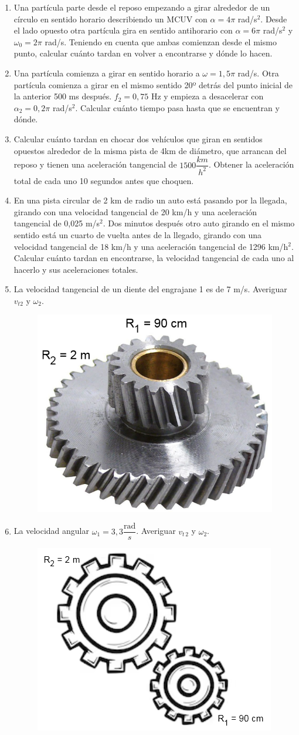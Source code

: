 \begin{enumerate}[label=\arabic*)]
\item Una partícula parte desde el reposo empezando a girar alrededor de un círculo en sentido horario describiendo un MCUV con $\alpha = 4\pi$ rad/s$^2$. Desde el lado opuesto otra partícula gira en sentido antihorario con $\alpha = 6\pi$ rad/s$^2$ y $\omega_0=2\pi$ rad/s. Teniendo en cuenta que ambas comienzan desde el mismo punto, calcular cuánto tardan en volver a encontrarse y dónde lo hacen.

\item Una partícula comienza a girar en sentido horario a $\omega=1,5\pi$ rad/s. Otra partícula comienza a girar en el mismo sentido 20º detrás del punto inicial de la anterior 500 ms después. $f_2 = 0,75$ Hz y empieza a desacelerar con $\alpha_2 = 0,2\pi$ rad/s$^2$. Calcular cuánto tiempo pasa hasta que se encuentran y dónde.

\item Calcular cuánto tardan en chocar dos vehículos que giran en sentidos opuestos alrededor de la misma pista de 4km de diámetro, que arrancan del reposo y tienen una aceleración tangencial de $1500 \dfrac{km}{h^2}$. Obtener la aceleración total de cada uno 10 segundos antes que choquen.

\newpage
\item En una pista circular de 2 km de radio un auto está pasando por la llegada, girando con una velocidad tangencial de 20 km/h y una aceleración tangencial de 0,025 m/s$^2$. Dos minutos después otro auto girando en el mismo sentido está un cuarto de vuelta antes de la llegado, girando con una velocidad tangencial de 18 km/h y una aceleración tangencial de 1296 km/h$^2$. Calcular cuánto tardan en encontrarse, la velocidad tangencial de cada uno al hacerlo y sus aceleraciones totales.


\item La velocidad tangencial de un diente del engrajane 1 es de 7 m/s. Averiguar $v_{t2}$ y $\omega_2$.
\begin{figure}[H]
    \centering
    \includegraphics[width=0.3\linewidth]{images/engranaje_1.png}
\end{figure}

\item La velocidad angular $\omega_1 = 3,3\dfrac{\text{rad}}{s}$. Averiguar $v_{t\,2}$ y $\omega_2$.

\begin{figure}[H]
    \centering
    \includegraphics[width=0.4\linewidth]{images/engranaje_2.png}
\end{figure}    
\end{enumerate}
